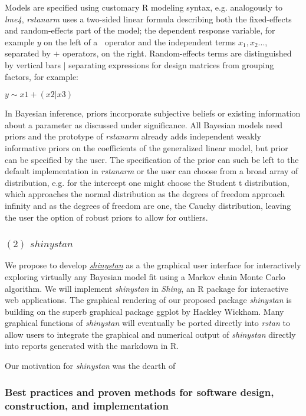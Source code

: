 \documentclass[11pt,notitlepage]{article}
\begin{document}
Models are specified using customary R modeling syntax, e.g. analogously to \textit{lme4}, \textit{rstanarm} uses a two-sided linear formula describing both the fixed-effects and random-effects part of the model; the dependent response variable, for example $y$ on the left of a $~$ operator and the independent terms $x_1, x_2...$, separated by $+$ operators, on the right. Random-effects terms are distinguished by vertical bars $|$ separating expressions for design matrices from grouping factors, for example:

$y \sim x1 +(x2|x3)$

In Bayesian inference, priors incorporate subjective beliefs or existing information about a parameter as discussed under significance. All Bayesian models need priors and the prototype of \textit{rstanarm} already adds independent weakly informative priors on the coefficients of the generalized linear model, but prior can be specified by the user. The specification of the prior can such be left to the default implementation in \textit{rstanarm} or the user can choose from a broad array of distribution, e.g. for the intercept one might choose the Student t distribution, which approaches the normal distribution as the degrees of freedom approach infinity and as the degrees of freedom are one, the Cauchy distribution, leaving the user the option of robust priors to allow for outliers. 


\subsubsection*  {$(2)$ $shinystan$}
We propose to develop \href{http://andrewgelman.com/2015/03/02/introducing-shinystan/}{\textit{shinystan}} as a the graphical user interface for interactively exploring virtually any Bayesian model fit using a Markov chain Monte Carlo algorithm. We will implement \textit{shinystan} in \textit{Shiny}, an R package for interactive web applications. The graphical rendering of our proposed package \textit{shinystan} is building on the superb graphical package ggplot by Hackley Wickham. Many graphical functions of \textit{shinystan} will eventually be ported directly into \textit{rstan} to allow users to integrate the graphical and numerical output of \textit{shinystan} directly into reports generated with the markdown in R.

Our motivation for \textit{shinystan} was the dearth of 
 
\subsubsection*{Best practices and proven methods for software design, construction, and implementation}
\end{document}
